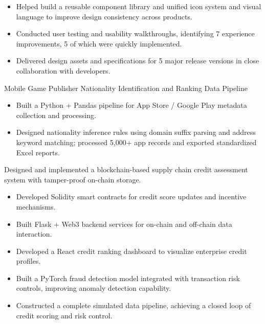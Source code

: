 


\begin{itemize}
  \item Helped build a reusable component library and unified icon system and visual language to improve design consistency across products.
  \item Conducted user testing and usability walkthroughs, identifying 7 experience improvements, 5 of which were quickly implemented.
  \item Delivered design assets and specifications for 5 major release versions in close collaboration with developers.
\end{itemize}
Mobile Game Publisher Nationality Identification and Ranking Data Pipeline
\begin{itemize}
  \item Built a Python + Pandas pipeline for App Store / Google Play metadata collection and processing.
  \item Designed nationality inference rules using domain suffix parsing and address keyword matching; processed 5,000+ app records and exported standardized Excel reports.
\end{itemize}


Designed and implemented a blockchain-based supply chain credit assessment system with tamper-proof on-chain storage.
\begin{itemize}
  \item Developed Solidity smart contracts for credit score updates and incentive mechanisms.
  \item Built Flask + Web3 backend services for on-chain and off-chain data interaction.
  \item Developed a React credit ranking dashboard to visualize enterprise credit profiles.
  \item Built a PyTorch fraud detection model integrated with transaction risk controls, improving anomaly detection capability.
  \item Constructed a complete simulated data pipeline, achieving a closed loop of credit scoring and risk control.
\end{itemize}

